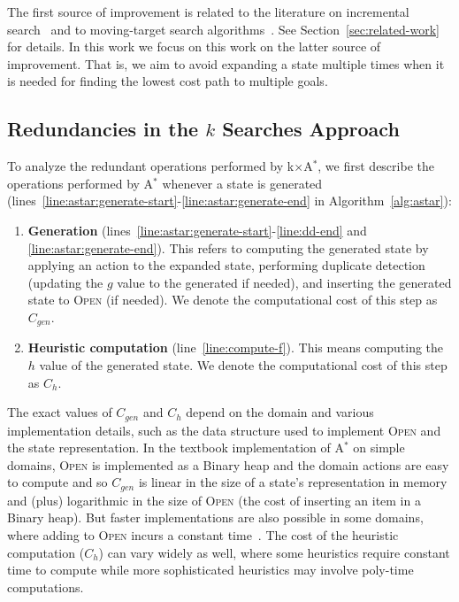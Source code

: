 \documentclass{aicom2e}
\newcommand{\astar}{A$^*$}
\newcommand{\kxastar}{k$\times$A$^*$}
\newcommand{\open}{\textsc{Open}}
\begin{document}
The first source of improvement is related to the literature on incremental
search~\cite{koenig2004lifelong} and to moving-target search
algorithms~\cite{ishida1995moving,koenig2007speeding}. See
Section~\ref{sec:related-work} for details. In this work we focus on this work
on the latter source of improvement. That is, we aim to avoid expanding a state
multiple times when it is needed for finding the lowest cost path to multiple goals.


\subsection{Redundancies in the $k$ Searches Approach}


To analyze the redundant operations performed by \kxastar{}, we first describe
the operations performed by \astar{} whenever a state is generated
(lines~\ref{line:astar:generate-start}-\ref{line:astar:generate-end} in
Algorithm~\ref{alg:astar}):

\begin{enumerate}
	\item {\bf Generation}  (lines~\ref{line:astar:generate-start}-\ref{line:dd-end} and \ref{line:astar:generate-end}). 
	This refers to computing the generated state by applying an action to the expanded state, 
	performing duplicate detection (updating the $g$ value to the generated if needed), 
	and inserting the generated state to \open{} (if needed). 
	We denote the computational cost of this step as $C_{gen}$.
	
		
	\item {\bf Heuristic computation}  (line~\ref{line:compute-f}). This means computing the $h$ value of the generated state. 
	We denote the computational cost of this step as $C_{h}$.
\end{enumerate}	
The exact values of $C_{gen}$ and $C_h$ depend on the domain and various implementation details, 
such as the data structure used to implement \open{} and the state representation. 
In the textbook implementation of \astar{} on simple domains, 
\open{} is implemented as a Binary heap and the domain actions are easy to compute 
and so $C_{gen}$ is linear in the size  of a state's representation in memory and (plus) logarithmic in the size of \open{} 
(the cost of inserting an item in a Binary heap). 
But faster implementations are also possible in some domains, where adding to \open{} incurs a constant time~\cite{GILON2016,BurnsHLR12}.
The cost of the heuristic computation ($C_h$) can vary widely as well, 
where some heuristics require constant time to compute while more sophisticated heuristics may involve poly-time computations. 
\end{document}
